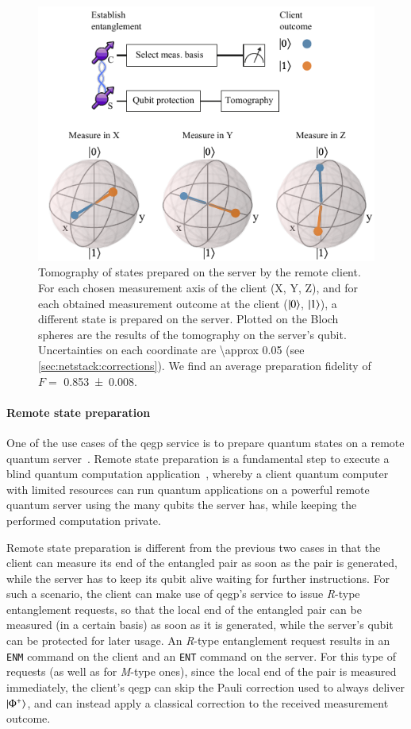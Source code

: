 \begin{figure}
    \centering
    \includegraphics[width=0.6\linewidth]{figures/rsprep.pdf}
    \caption{
        Tomography of states prepared on the server by the remote client. For each chosen
        measurement axis of the client (X, Y, Z), and for each obtained measurement outcome at the
        client ($\ket{0}$, $\ket{1}$), a different state is prepared on the server. Plotted on the
        Bloch spheres are the results of the tomography on the server's qubit. Uncertainties on each
        coordinate are \num{\approx 0.05} (see \cref{sec:netstack:corrections}). We find an average
        preparation fidelity of $F =$ \num{0.853(8)}.
    }
    \label{fig:rsprep}
\end{figure}

\paragraph{Remote state preparation}

One of the use cases of the \acrshort{qegp} service is to prepare quantum states on a remote quantum
server~\cite{dahlberg_2019_egp}. Remote state preparation is a fundamental step to execute a blind
quantum computation application~\cite{broadbent_2009_ubqc}, whereby a client quantum computer with
limited resources can run quantum applications on a powerful remote quantum server using the many
qubits the server has, while keeping the performed computation private.

Remote state preparation is different from the previous two cases in that the client can measure its
end of the entangled pair as soon as the pair is generated, while the server has to keep its qubit
alive waiting for further instructions. For such a scenario, the client can make use of
\acrshort{qegp}'s service to issue \emph{R}-type entanglement requests, so that the local end of the
entangled pair can be measured (in a certain basis) as soon as it is generated, while the server's
qubit can be protected for later usage. An \emph{R}-type entanglement request results in an
\texttt{ENM} command on the client and an \texttt{ENT} command on the server. For this type of
requests (as well as for \emph{M}-type ones), since the local end of the pair is measured
immediately, the client's \acrshort{qegp} can skip the Pauli correction used to always deliver
$\ket{\Phi^+}$, and can instead apply a classical correction to the received measurement outcome.

